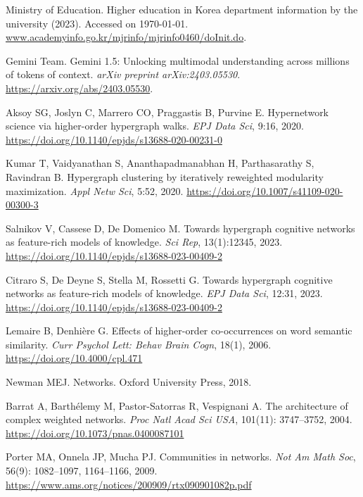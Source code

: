 \documentclass{bmcart}
\begin{document}
\begin{thebibliography}{99}
Ministry of Education. 
\newblock Higher education in Korea department information by the university (2023). 
\newblock Accessed on \today. \url{www.academyinfo.go.kr/mjrinfo/mjrinfo0460/doInit.do}.



Gemini Team. 
\newblock Gemini 1.5: Unlocking multimodal understanding across millions of tokens of context. 
\newblock \emph{arXiv preprint arXiv:2403.05530}. 
\newblock \url{https://arxiv.org/abs/2403.05530}.

Aksoy SG, Joslyn C, Marrero CO, Praggastis B, Purvine E.
\newblock Hypernetwork science via higher-order hypergraph walks.
\newblock \emph{EPJ Data Sci}, 9:16, 2020.
\newblock \url{https://doi.org/10.1140/epjds/s13688-020-00231-0}

Kumar T, Vaidyanathan S, Ananthapadmanabhan H, Parthasarathy S, Ravindran B.
\newblock Hypergraph clustering by iteratively reweighted modularity maximization.
\newblock \emph{Appl Netw Sci}, 5:52, 2020.
\newblock \url{https://doi.org/10.1007/s41109-020-00300-3}

Salnikov V, Cassese D, De Domenico M.
\newblock Towards hypergraph cognitive networks as feature-rich models of knowledge.
\newblock \emph{Sci Rep}, 13(1):12345, 2023.
\newblock \url{https://doi.org/10.1140/epjds/s13688-023-00409-2}

Citraro S, De Deyne S, Stella M, Rossetti G.
\newblock Towards hypergraph cognitive networks as feature-rich models of knowledge.
\newblock \emph{EPJ Data Sci}, 12:31, 2023.
\newblock \url{https://doi.org/10.1140/epjds/s13688-023-00409-2}

Lemaire B, Denhi{\`e}re G.
\newblock Effects of higher-order co-occurrences on word semantic similarity.
\newblock \emph{Curr Psychol Lett: Behav Brain Cogn}, 18(1), 2006.
\newblock \url{https://doi.org/10.4000/cpl.471}

Newman MEJ.
\newblock Networks.
\newblock Oxford University Press, 2018.

Barrat A, Barth{\'e}lemy M, Pastor-Satorras R, Vespignani A.
\newblock The architecture of complex weighted networks.
\newblock \emph{Proc Natl Acad Sci USA}, 101(11): 3747--3752, 2004.
\newblock \url{https://doi.org/10.1073/pnas.0400087101}

Porter MA, Onnela JP, Mucha PJ.
\newblock Communities in networks.
\newblock \emph{Not Am Math Soc}, 56(9): 1082--1097, 1164--1166, 2009.
\newblock \url{https://www.ams.org/notices/200909/rtx090901082p.pdf}


\end{thebibliography}
\end{document}
